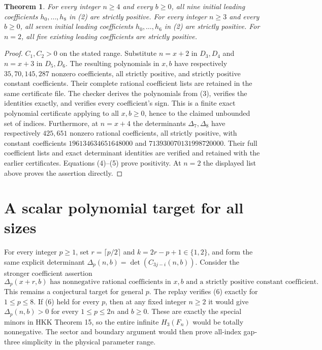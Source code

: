 \documentclass[11pt]{article}
\newtheorem{theorem}{Theorem}
\begin{document}
\begin{theorem}\label{thm:initial}
For every integer $n\ge4$ and every $b\ge0$, all nine initial
leading coefficients $h_0,\ldots,h_8$ in (2) are strictly positive.
For every integer $n\ge3$ and every $b\ge0$, all seven initial
leading coefficients $h_0,\ldots,h_6$ in (2) are strictly positive.
For $n=2$, all five existing leading coefficients are strictly positive.
\end{theorem}
\begin{proof}
$C_1,C_2>0$ on the stated range. Substitute $n=x+2$ in $D_3,D_4$
and $n=x+3$ in $D_5,D_6$.
The resulting polynomials in $x,b$ have respectively
$35,70,145,287$ nonzero coefficients, all strictly positive,
and strictly positive constant coefficients.
Their complete rational coefficient lists are retained in the same
certificate file. The checker derives the polynomials from (3),
verifies the identities exactly, and verifies every coefficient's sign.
This is a finite exact polynomial certificate applying to all
$x,b\ge0$, hence to the claimed unbounded set of indices.
Furthermore, at $n=x+4$ the determinants $\Delta_7,\Delta_8$
have respectively $425,651$ nonzero rational coefficients, all
strictly positive, with constant coefficients
$196134634651648000$ and $713930070131998720000$.
Their full coefficient lists and exact determinant identities are
verified and retained with the earlier certificates.
Equations (4)--(5) prove positivity. At $n=2$ the displayed list above
proves the assertion directly.
\end{proof}

\section{A scalar polynomial target for all sizes}
For every integer $p\ge1$, set $r=\lceil p/2\rceil$ and
$k=2r-p+1\in\{1,2\}$, and form the same explicit determinant
$\Delta_p(n,b)=\det(C_{3j-i}(n,b))$.
Consider the stronger coefficient assertion
\[
 \Delta_p(x+r,b)\text{ has nonnegative rational coefficients in }x,b
 \text{ and a strictly positive constant coefficient}.        \tag{6}
\]
This remains a conjectural target for general $p$.
The replay verifies (6) exactly for $1\le p\le8$.
If (6) held for every $p$, then at any fixed integer $n\ge2$
it would give $\Delta_p(n,b)>0$ for every $1\le p\le2n$ and
$b\ge0$. These are exactly the special minors in HKK Theorem 15,
so the entire infinite $H_3(F_n)$ would be totally nonnegative.
The sector and boundary argument would then prove all-index gap-three
simplicity in the physical parameter range.
\end{document}
